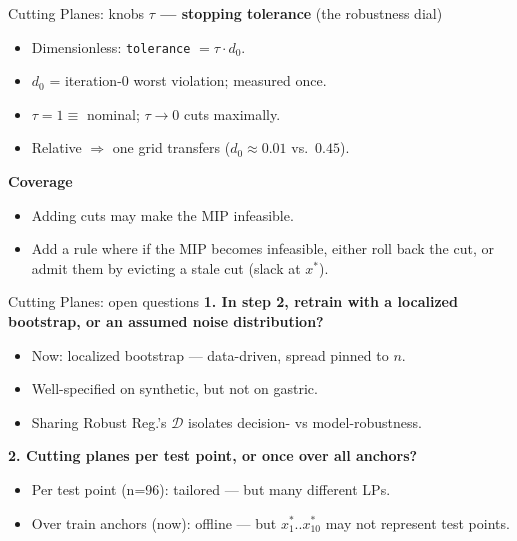 \documentclass{beamer}
\begin{document}
\begin{frame}{Cutting Planes: knobs}
  \textbf{$\tau$ --- stopping tolerance} (the robustness dial)
  \begin{itemize}
    \item Dimensionless: \texttt{tolerance} $=\tau\cdot d_0$.
    \item $d_0$ = iteration-0 worst violation; measured once.
    \item $\tau=1\equiv$ nominal; $\tau\to 0$ cuts maximally.
    \item Relative $\Rightarrow$ one grid transfers ($d_0\!\approx\!0.01$ vs.\ $0.45$).
  \end{itemize}
  \medskip
  \textbf{Coverage}
  \begin{itemize}
    \item Adding cuts may make the MIP infeasible.
    \item Add a rule where if the MIP becomes infeasible, either roll back the cut, or admit them by evicting a stale cut (slack at $x^*$).
  \end{itemize}
\end{frame}

\begin{frame}{Cutting Planes: open questions}
  \textbf{1. In step 2, retrain with a localized bootstrap, or an assumed noise distribution?}
  \begin{itemize}
    \item Now: localized bootstrap --- data-driven, spread pinned to $n$.
    \item Well-specified on synthetic, but not on gastric.
    \item Sharing Robust Reg.'s $\mathcal D$ isolates decision- vs model-robustness.
  \end{itemize}
  \medskip
  \textbf{2. Cutting planes per test point, or once over all anchors?}
  \begin{itemize}
    \item Per test point (n=96): tailored --- but many different LPs.
    \item Over train anchors (now): offline --- but $x^\ast_1..x^\ast_{10}$ may not represent test points.
  \end{itemize}
\end{frame}
\end{document}
